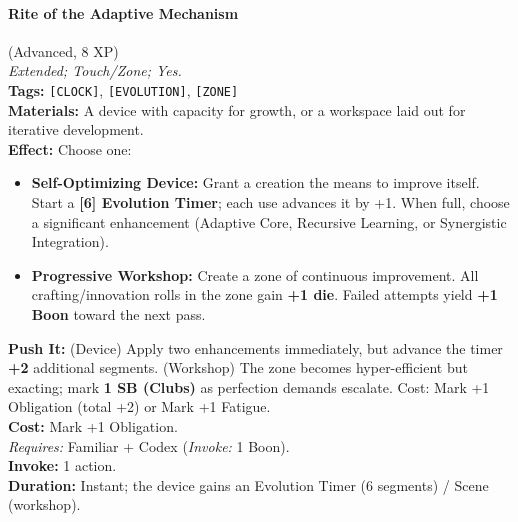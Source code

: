 \paragraph{Rite of the Adaptive Mechanism} (Advanced, 8 XP) \hfill \\
\emph{Extended; Touch/Zone; Yes.} \\
\textbf{Tags:} \texttt{[CLOCK]}, \texttt{[EVOLUTION]}, \texttt{[ZONE]} \\
\textbf{Materials:} A device with capacity for growth, or a workspace laid out for iterative development. \\
\textbf{Effect:} Choose one:
\begin{itemize}
  \item \textbf{Self-Optimizing Device:} Grant a creation the means to improve itself. Start a \textbf{[6] Evolution Timer}; each use advances it by +1. When full, choose a significant enhancement (Adaptive Core, Recursive Learning, or Synergistic Integration).
  \item \textbf{Progressive Workshop:} Create a zone of continuous improvement. All crafting/innovation rolls in the zone gain \textbf{+1 die}. Failed attempts yield \textbf{+1 Boon} toward the next pass.
\end{itemize}
\textbf{Push It:} (Device) Apply two enhancements immediately, but advance the timer \textbf{+2} additional segments. (Workshop) The zone becomes hyper-efficient but exacting; mark \textbf{1 SB (Clubs)} as perfection demands escalate. Cost: Mark +1 Obligation (total +2) or Mark +1 Fatigue. \\
\textbf{Cost:} Mark +1 Obligation. \\
\textit{Requires:} Familiar + Codex (\textit{Invoke:} 1 Boon). \\
\textbf{Invoke:} 1 action. \\
\textbf{Duration:} Instant; the device gains an Evolution Timer (6 segments) / Scene (workshop).

